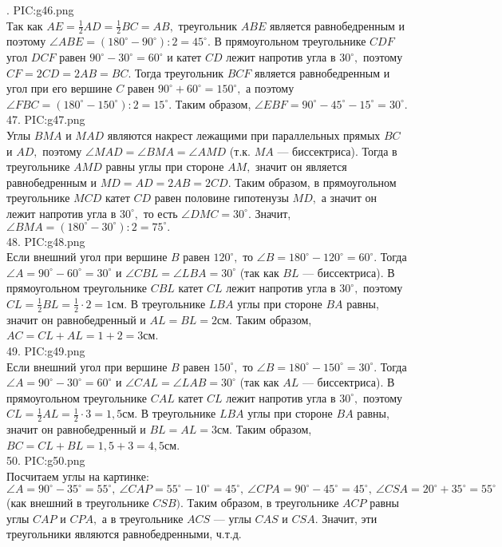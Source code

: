 . {{PIC:g46.png}}\\
Так как $AE=\frac{1}{2}AD=\frac{1}{2}BC=AB,$ треугольник $ABE$ является равнобедренным и поэтому $\angle ABE=(180^\circ-90^\circ):2=45^\circ.$ В прямоугольном треугольнике $CDF$ угол $DCF$ равен $90^\circ-30^\circ=60^\circ$ и катет $CD$ лежит напротив угла в $30^\circ,$ поэтому $CF=2CD=2AB=BC.$ Тогда треугольник $BCF$ является равнобедренным и угол при его вершине $C$ равен $90^\circ+60^\circ=150^\circ,$ а поэтому $\angle FBC=(180^\circ-150^\circ):2=15^\circ.$ Таким образом, $\angle EBF=90^\circ-45^\circ-15^\circ=30^\circ.$\\
47. {{PIC:g47.png}}\\
Углы $BMA$ и $MAD$ являются накрест лежащими при параллельных прямых $BC$ и $AD,$ поэтому $\angle MAD=\angle BMA=\angle AMD$ (т.к. $MA$ --- биссектриса). Тогда в треугольнике $AMD$ равны углы при стороне $AM,$ значит он является равнобедренным и $MD=AD=2AB=2CD.$ Таким образом, в прямоугольном треугольнике $MCD$ катет $CD$ равен половине гипотенузы $MD,$ а значит он лежит напротив угла в $30^\circ,$ то есть $\angle DMC=30^\circ.$ Значит, $\angle BMA=(180^\circ-30^\circ):2=75^\circ.$\\
48. {{PIC:g48.png}}\\
Если внешний угол при вершине $B$ равен $120^\circ,$ то $\angle B=180^\circ-120^\circ=60^\circ.$ Тогда $\angle A=90^\circ-60^\circ=30^\circ$ и $\angle CBL=\angle LBA=30^\circ$ (так как $BL$ --- биссектриса). В прямоугольном треугольнике $CBL$ катет $CL$ лежит напротив угла в $30^\circ,$ поэтому $CL=\frac{1}{2}BL=\frac{1}{2}\cdot2=1$см. В треугольнике $LBA$ углы при стороне $BA$ равны, значит он равнобедренный и $AL=BL=2$см. Таким образом, $AC=CL+AL=1+2=3$см.\\
49. {{PIC:g49.png}}\\
Если внешний угол при вершине $B$ равен $150^\circ,$ то $\angle B=180^\circ-150^\circ=30^\circ.$ Тогда $\angle A=90^\circ-30^\circ=60^\circ$ и $\angle CAL=\angle LAB=30^\circ$ (так как $AL$ --- биссектриса). В прямоугольном треугольнике $CAL$ катет $CL$ лежит напротив угла в $30^\circ,$ поэтому $CL=\frac{1}{2}AL=\frac{1}{2}\cdot3=1,5$см. В треугольнике $LBA$ углы при стороне $BA$ равны, значит он равнобедренный и $BL=AL=3$см. Таким образом, $BC=CL+BL=1,5+3=4,5$см.\\
50. {{PIC:g50.png}}\\
Посчитаем углы на картинке: $\angle A=90^\circ-35^\circ=55^\circ,\ \angle CAP=55^\circ-10^\circ=45^\circ,\ \angle CPA=90^\circ-45^\circ=45^\circ,\ \angle CSA=20^\circ+35^\circ=55^\circ$ (как внешний в треугольнике $CSB).$ Таким образом, в треугольнике $ACP$ равны углы $CAP$ и $CPA,$ а в треугольнике $ACS$ --- углы $CAS$ и $CSA.$ Значит, эти треугольники являются равнобедренными, ч.т.д.\\
